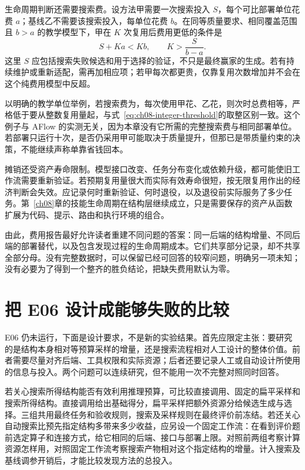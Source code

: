 生命周期判断还需要搜索费。设方法甲需要一次搜索投入 $S$，每个可比部署单位花费 $a$；基线乙不需要该搜索投入，每单位花费 $b$。在同等质量要求、相同覆盖范围且 $b>a$ 的教学模型下，甲在 $K$ 次复用后费用更低的条件是
\begin{equation}
 S+Ka<Kb,\qquad K>\frac{S}{b-a}.
 \label{eq:ch09-amortization}
\end{equation}
这里 $S$ 应包括搜索失败候选和用于选择的验证，不只是最终赢家的生成。若有持续维护或重新适配，需再加相应项；若甲每次都更贵，仅靠复用次数增加并不会在这个纯费用模型中反超。

以明确的教学单位举例，若搜索费为，每次使用甲花、乙花，则次时总费相等，严格低于要从整数复用量起，与式~\ref{eq:ch08-integer-threshold}的取整区别一致。这个例子与 AFlow 的实测无关，因为本章没有它所需的完整搜索费与相同部署单位。若部署只运行十次，是否仍采用甲可能取决于质量提升，但那已是带质量约束的决策，不能继续声称单靠省钱回本。

摊销还受资产寿命限制。模型接口改变、任务分布变化或依赖升级，都可能使旧工作流需要重新验证。若预期复用量很大而实际有效寿命很短，按无限复用作出的经济判断会失效。应记录何时重新验证、何时退役，以及退役前实际服务了多少任务。第~\ref{ch08}章的技能生命周期在结构层继续成立，只是需要保存的资产从函数扩展为代码、提示、路由和执行环境的组合。

由此，费用报告最好允许读者重建不同问题的答案：同一后端的结构增量、不同后端的部署替代，以及包含发现过程的生命周期成本。它们共享部分记录，却不共享全部分母。没有完整数据时，可以保留已经可回答的较窄问题，明确另一项未知；没有必要为了得到一个整齐的胜负结论，把缺失费用默认为零。

\section{把 E06 设计成能够失败的比较}
\label{sec:ch09-e06design}

E06 仍未运行，下面是设计要求，不是新的实验结果。首先应限定主张：要研究的是结构本身相对等预算采样的增量，还是搜索流程相对人工设计的整体价值。前者需要尽量对齐后端、工具权限和实际资源；后者还要记录人工或自动设计所使用的信息与投入。两个问题可以连续研究，但不能用一次不完整对照同时回答。

若关心搜索所得结构能否有效利用推理预算，可比较直接调用、固定的扁平采样和搜索所得结构。直接调用给出基础得分，扁平采样把额外资源分给候选生成与选择。三组共用最终任务和验收规则，搜索及采样规则在最终评价前冻结。若还关心自动搜索比预先指定结构多带来多少收益，应另设一个固定工作流：在看到评价题前选定算子和连接方式，给它相同的后端、接口与部署上限。对照前两组考察计算资源怎样用，对照固定工作流考察搜索产物相对这个指定结构的增量。计入搜索及基线调参开销后，才能比较发现方法的总投入。

